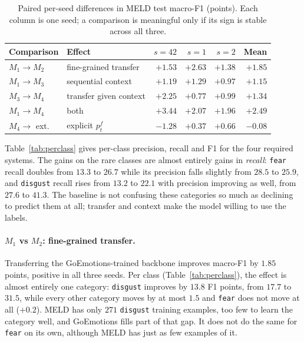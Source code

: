 \documentclass[sigconf,nonacm]{acmart}
\begin{document}
\begin{table}[t]
\centering
\caption{Paired per-seed differences in MELD test macro-F1 (points). Each column is one
seed; a comparison is meaningful only if its sign is stable across all three.}
\label{tab:paired}
\begin{tabular}{llrrrr}
\toprule
Comparison & Effect & $s{=}42$ & $s{=}1$ & $s{=}2$ & Mean \\
\midrule
$M_1 \rightarrow M_2$ & fine-grained transfer            & $+1.53$ & $+2.63$ & $+1.38$ & $+1.85$ \\
$M_1 \rightarrow M_3$ & sequential context               & $+1.19$ & $+1.29$ & $+0.97$ & $+1.15$ \\
$M_3 \rightarrow M_4$ & transfer given context           & $+2.25$ & $+0.77$ & $+0.99$ & $+1.34$ \\
$M_1 \rightarrow M_4$ & both                             & $+3.44$ & $+2.07$ & $+1.96$ & $+2.49$ \\
\midrule
$M_4 \rightarrow$ ext. & explicit $p^f_t$                & $-1.28$ & $+0.37$ & $+0.66$ & $-0.08$ \\
\bottomrule
\end{tabular}
\end{table}




Table~\ref{tab:perclass} gives per-class precision, recall and F1 for the four required
systems. The gains on the rare classes are almost entirely gains in \emph{recall}:
\texttt{fear} recall doubles from $13.3$ to $26.7$ while its precision falls slightly from
$28.5$ to $25.9$, and \texttt{disgust} recall rises from $13.2$ to $22.1$ with precision
improving as well, from $27.6$ to $41.3$. The baseline is not confusing these categories so
much as declining to predict them at all; transfer and context make the model willing to
use the labels.

\paragraph{$M_1$ vs $M_2$: fine-grained transfer.}
Transferring the GoEmotions-trained backbone improves macro-F1 by $1.85$ points, positive
in all three seeds. Per class (Table~\ref{tab:perclass}), the effect is almost entirely
one category: \texttt{disgust} improves by $13.8$ F1 points, from $17.7$ to $31.5$, while
every other category moves by at most $1.5$ and \texttt{fear} does not move at all
($+0.2$). MELD has only $271$ \texttt{disgust} training examples, too few to learn the
category well, and GoEmotions fills part of that gap. It does not do the same for
\texttt{fear} on its own, although MELD has just as few examples of it.
\end{document}
